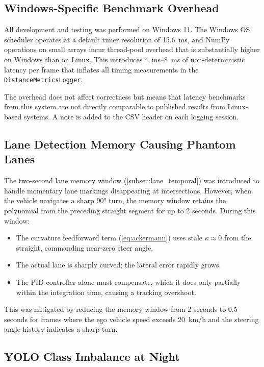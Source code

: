 \documentclass[12pt,a4paper]{article}
\begin{document}
\subsection{Windows-Specific Benchmark Overhead}

All development and testing was performed on Windows 11.  The Windows OS
scheduler operates at a default timer resolution of \SI{15.6}{\milli\second},
and NumPy operations on small arrays incur thread-pool overhead that is
substantially higher on Windows than on Linux.  This introduces
\SI{4}{\milli\second}--\SI{8}{\milli\second} of non-deterministic latency per
frame that inflates all timing measurements in the
\texttt{DistanceMetricsLogger}.

The overhead does not affect correctness but means that latency benchmarks
from this system are not directly comparable to published results from
Linux-based systems.  A note is added to the CSV header on each logging
session.

\subsection{Lane Detection Memory Causing Phantom Lanes}

The two-second lane memory window (\cref{subsec:lane_temporal}) was introduced
to handle momentary lane markings disappearing at intersections.  However,
when the vehicle navigates a sharp 90° turn, the memory window retains the
polynomial from the preceding straight segment for up to 2 seconds.  During
this window:

\begin{itemize}[nosep]
  \item The curvature feedforward term (\cref{eq:ackermann}) uses stale
        $\kappa \approx 0$ from the straight, commanding near-zero steer angle.
  \item The actual lane is sharply curved; the lateral error rapidly grows.
  \item The PID controller alone must compensate, which it does only partially
        within the integration time, causing a tracking overshoot.
\end{itemize}

This was mitigated by reducing the memory window from 2 seconds to
0.5 seconds for frames where the ego vehicle speed exceeds \SI{20}{km/h}
and the steering angle history indicates a sharp turn.

\subsection{YOLO Class Imbalance at Night}
\end{document}
